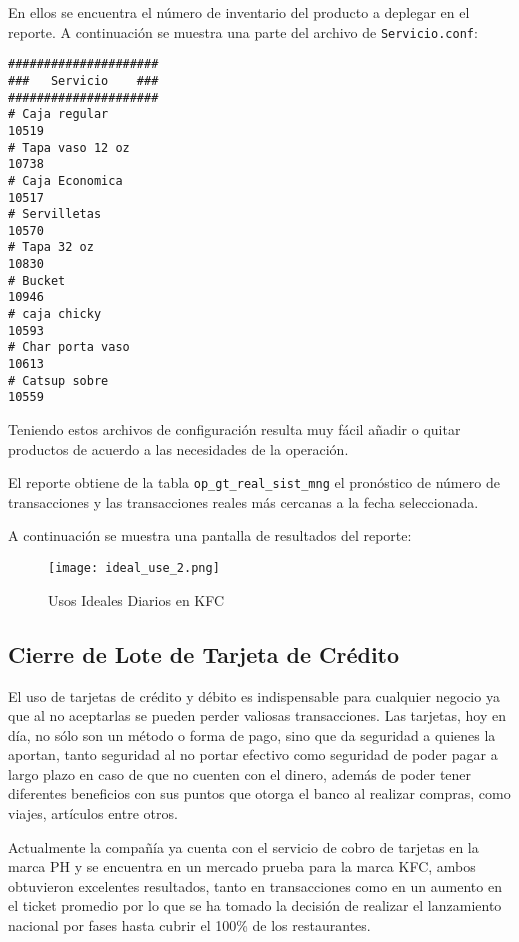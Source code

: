 En ellos se encuentra el número de inventario del producto a deplegar en el reporte. A continuación se muestra una parte del archivo de \texttt{Servicio.conf}:

\begin{Verbatim}[fontsize=\small]
#####################
###   Servicio    ###
#####################
# Caja regular
10519
# Tapa vaso 12 oz
10738
# Caja Economica
10517
# Servilletas
10570
# Tapa 32 oz
10830
# Bucket
10946
# caja chicky
10593
# Char porta vaso
10613
# Catsup sobre
10559
\end{Verbatim}

Teniendo estos archivos de configuración resulta muy fácil añadir o quitar productos de acuerdo a las necesidades de la operación.

El reporte obtiene de la tabla \texttt{op\_gt\_real\_sist\_mng} el pronóstico de número de transacciones y las transacciones reales más cercanas a la fecha seleccionada.

A continuación se muestra una pantalla de resultados del reporte:

\begin{figure}[htb]
 \begin{center}
  \texttt{[image: ideal\_use\_2.png]}
 \end{center}
 \caption{Usos Ideales Diarios en KFC}
 \label{fig:usos_ideales_kfc}
\end{figure}

\subsection{Cierre de Lote de Tarjeta de Crédito}
\label{sec:cierre_lote}

El uso de tarjetas de crédito y débito es indispensable para cualquier negocio ya que al no aceptarlas se pueden perder valiosas transacciones. Las tarjetas, hoy en día, no sólo son un método o forma de pago, sino que da seguridad a quienes la aportan, tanto seguridad al no portar efectivo como seguridad de poder pagar a largo plazo en caso de que no cuenten con el dinero, además de poder tener diferentes beneficios con sus puntos que otorga el banco al realizar compras, como viajes, artículos entre otros.

Actualmente la compañía ya cuenta con el servicio de cobro de tarjetas en la marca PH y se encuentra en un mercado prueba para la marca KFC, ambos obtuvieron excelentes resultados, tanto en transacciones como en un aumento en el ticket promedio por lo que se ha tomado la
decisión de realizar el lanzamiento nacional por fases hasta cubrir el 100\% de los restaurantes.

